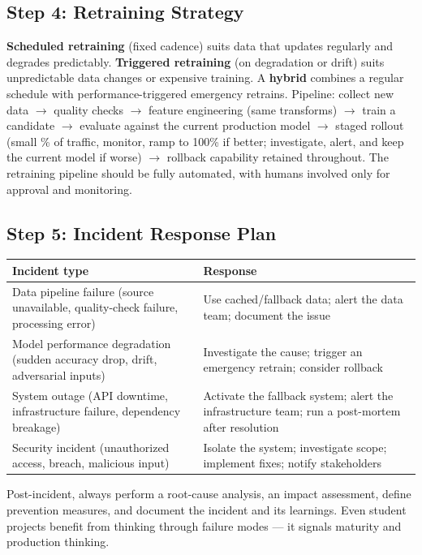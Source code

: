 \subsection{Step 4: Retraining Strategy}

\textbf{Scheduled retraining} (fixed cadence) suits data that updates regularly and degrades predictably.
\textbf{Triggered retraining} (on degradation or drift) suits unpredictable data changes or expensive training. A
\textbf{hybrid} combines a regular schedule with performance-triggered emergency retrains. Pipeline: collect new
data $\rightarrow$ quality checks $\rightarrow$ feature engineering (same transforms) $\rightarrow$ train a
candidate $\rightarrow$ evaluate against the current production model $\rightarrow$ staged rollout (small \% of
traffic, monitor, ramp to 100\% if better; investigate, alert, and keep the current model if worse) $\rightarrow$
rollback capability retained throughout. The retraining pipeline should be fully automated, with humans involved
only for approval and monitoring.

\subsection{Step 5: Incident Response Plan}

\begin{longtable}{p{} p{}}
\toprule
\textbf{Incident type} & \textbf{Response} \\
\midrule
\endhead
Data pipeline failure (source unavailable, quality-check failure, processing error) & Use cached/fallback data;
alert the data team; document the issue \\
Model performance degradation (sudden accuracy drop, drift, adversarial inputs) & Investigate the cause; trigger
an emergency retrain; consider rollback \\
System outage (API downtime, infrastructure failure, dependency breakage) & Activate the fallback system; alert
the infrastructure team; run a post-mortem after resolution \\
Security incident (unauthorized access, breach, malicious input) & Isolate the system; investigate scope;
implement fixes; notify stakeholders \\
\bottomrule
\end{longtable}

Post-incident, always perform a root-cause analysis, an impact assessment, define prevention measures, and
document the incident and its learnings. Even student projects benefit from thinking through failure modes --- it
signals maturity and production thinking.

